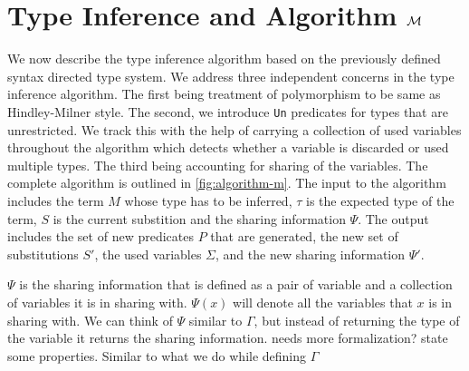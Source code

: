 \section{Type Inference and Algorithm $\mathcal{M}$}\label{sec:algorithm-m}
We now describe the type inference algorithm based on the previously defined syntax directed
type system. We address three independent concerns in the type inference algorithm.
The first being treatment of polymorphism to be same as Hindley-Milner style. The second, we introduce
\texttt{Un} predicates for types that are unrestricted. We track this with the help of carrying a
collection of used variables throughout the algorithm which detects whether a variable is discarded
or used multiple types. The third being accounting for sharing of the variables.
The complete algorithm is outlined in \cref{fig:algorithm-m}. The input to the algorithm includes the term $M$ whose
type has to be inferred, $\tau$ is the expected type of the term, $S$ is the current substition and the
sharing information $\Psi$. The output includes the set of new predicates $P$ that are generated,
the new set of substitutions $S'$, the used variables $\Sigma$, and the new sharing information $\Psi'$.

$\Psi$ is the sharing information that is defined as a pair of variable and a collection of variables it is in sharing with.
$\Psi(x)$ will denote all the variables that $x$ is in sharing with. We can think of $\Psi$ similar to $\Gamma$, but instead
of returning the type of the variable it returns the sharing information. {\color{red} needs more formalization? state some
properties. Similar to what we do while defining $\Gamma$}

